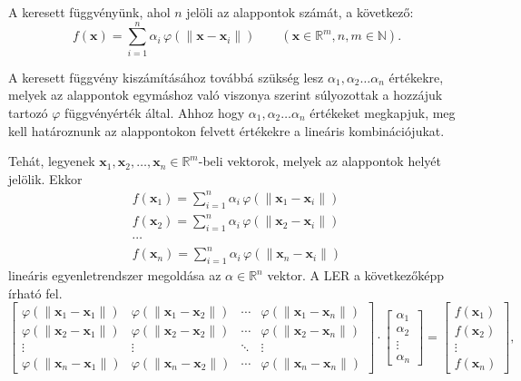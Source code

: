 		A keresett függvényünk, ahol $n$ jelöli az alappontok számát, a következő:
		\[f(\mathbf{x}) = \sum_{i=1}^n \alpha_i \, \varphi(\|\mathbf{x} - \mathbf{x}_i\|) \qquad (\mathbf{x} \in \mathbb{R}^m, n,m \in \mathbb{N}).\]
		
		
		A keresett függvény kiszámításához továbbá szükség lesz $\alpha_1,\alpha_2\ldots\alpha_n$ értékekre, melyek az alappontok egymáshoz való viszonya szerint súlyozottak a hozzájuk tartozó $\varphi$ függvényérték által. Ahhoz hogy $\alpha_1,\alpha_2\ldots\alpha_n$ értékeket megkapjuk, meg kell határoznunk az alappontokon felvett értékekre a lineáris kombinációjukat.
		
		Tehát, legyenek $\mathbf{x}_1, \mathbf{x}_2, \ldots , \mathbf{x}_n \in \mathbb{R}^m$-beli vektorok, melyek az alappontok helyét jelölik. 
		Ekkor 
			\begin{gather*}
				f(\mathbf{x}_1) = \sum_{i=1}^n \alpha_i \, \varphi(\|\mathbf{x}_1 - \mathbf{x}_i\|)\\
				f(\mathbf{x}_2) = \sum_{i=1}^n \alpha_i \, \varphi(\|\mathbf{x}_2 - \mathbf{x}_i\|)\\
				\cdots\\
				f(\mathbf{x}_n) = \sum_{i=1}^n \alpha_i \, \varphi(\|\mathbf{x}_n - \mathbf{x}_i\|)
			\end{gather*}
		lineáris egyenletrendszer megoldása az $\alpha \in \mathbb{R}^n$ vektor. A LER a következőképp írható fel.
		\begin{equation}
		\begin{bmatrix}
			\varphi(\|\mathbf{x}_1 - \mathbf{x}_1\|) & \varphi(\|\mathbf{x}_1 - \mathbf{x}_2\|) & \cdots & \varphi(\|\mathbf{x}_1 - \mathbf{x}_n\|) \\
			\varphi(\|\mathbf{x}_2 - \mathbf{x}_1\|) & \varphi(\|\mathbf{x}_2 - \mathbf{x}_2\|) & \cdots & \varphi(\|\mathbf{x}_2 - \mathbf{x}_n\|) \\
			\vdots    & \vdots     & \ddots & \vdots\\
			\varphi(\|\mathbf{x}_n - \mathbf{x}_1\|) & \varphi(\|\mathbf{x}_n - \mathbf{x}_2\|) & \cdots & \varphi(\|\mathbf{x}_n - \mathbf{x}_n\|)
		\end{bmatrix}
		\cdot
		\begin{bmatrix}
			\alpha_1 \\
			\alpha_2 \\
			\vdots \\
			\alpha_n
		\end{bmatrix}
		=
		\begin{bmatrix}
			f(\mathbf{x}_1) \\
			f(\mathbf{x}_2) \\
			\vdots \\
			f(\mathbf{x}_n)
		\end{bmatrix},\label{eq:egyes}
		\end{equation}
